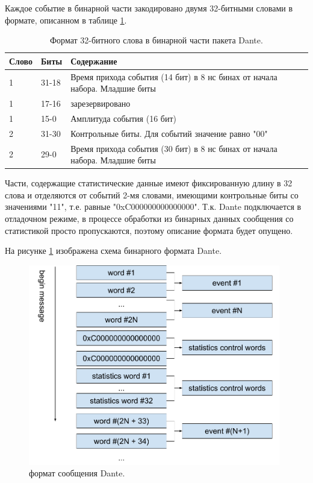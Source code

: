 \documentclass[a4paper,14pt]{extreport}
\begin{document}
Каждое событие в бинарной части закодировано двумя 32-битными словами в формате, описанном в таблице \ref{tab:dante-binary-word-format}.

\begin{table}
    \centering
    \begin{tabular}{|l|l|p{}|}
        \hline
        Слово & Биты & Содержание \\
        \hline
        1 & 31-18 & Время прихода события (14 бит) в 8 нс бинах от начала набора. Младшие биты \\
        \hline
        1 & 17-16 & зарезервировано \\
        \hline
        1 & 15-0 & Амплитуда события (16 бит) \\
        \hline
        2 & 31-30 & Контрольные биты. Для событий значение равно "00" \\
        \hline
        2 & 29-0 & Время прихода события (30 бит) в 8 нс бинах от начала набора. Младшие биты \\
        \hline
    \end{tabular}
    \caption{Формат 32-битного слова в бинарной части пакета Dante.}
    \label{tab:dante-binary-word-format}
\end{table}

Части, содержащие статистические данные имеют фиксированную длину в 32 слова и отделяются от событий 2-мя словами, имеющими контрольные биты со значениями "11", т.е. равные "0xC000000000000000". Т.к. Dante подключается в отладочном режиме, в процессе обработки из бинарных данных сообщения со статистикой просто пропускаются, поэтому описание формата будет опущено.

На рисунке \ref{fig:dante-message} изображена схема бинарного формата Dante.

\begin{figure}
  \centering
  \includegraphics[width = 0.98\textwidth]{img/dante/message.pdf}
    \caption{формат сообщения Dante.}
    \label{fig:dante-message}
\end{figure}
\end{document}
